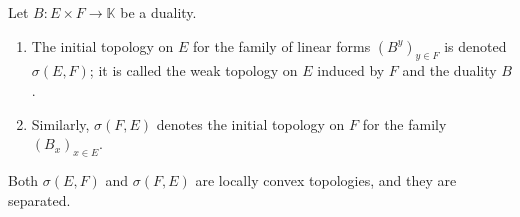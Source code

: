 Let $B: E \times F \to \mathbb{K}$ be a duality.
\begin{enumerate}
\item[(i)] The initial topology on $E$ for the family of linear forms $(B^y)_{y \in F}$ is denoted $\sigma(E, F)$; it is called the weak topology on $E$ induced by $F$ and the duality $B$.
\item[(ii)] Similarly, $\sigma(F, E)$ denotes the initial topology on $F$ for the family $(B_x)_{x \in E}$.
\end{enumerate}
Both $\sigma(E,F)$ and $\sigma(F,E)$ are locally convex topologies, and they are separated.
